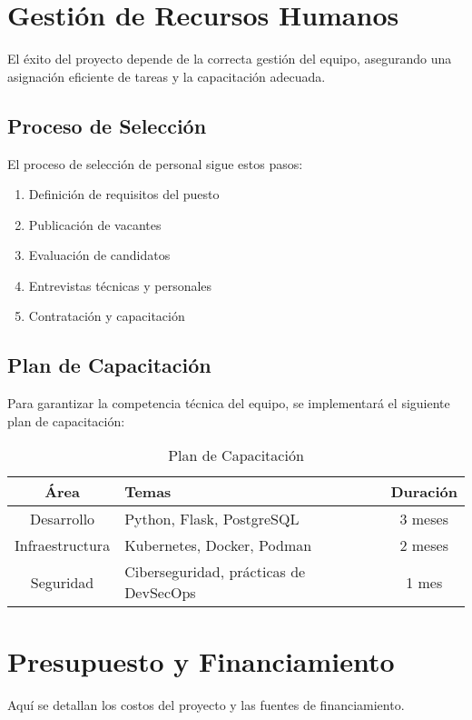 \section{Gestión de Recursos Humanos}

El éxito del proyecto depende de la correcta gestión del equipo, asegurando una asignación eficiente de tareas y la capacitación adecuada.

\subsection{Proceso de Selección}
El proceso de selección de personal sigue estos pasos:
\begin{enumerate}
	\item Definición de requisitos del puesto
	\item Publicación de vacantes
	\item Evaluación de candidatos
	\item Entrevistas técnicas y personales
	\item Contratación y capacitación
\end{enumerate}

\subsection{Plan de Capacitación}
Para garantizar la competencia técnica del equipo, se implementará el siguiente plan de capacitación:

\begin{table}[h]
	\centering
	\begin{tabular}{|c|l|c|}
		\hline
		\textbf{Área} & \textbf{Temas} & \textbf{Duración} \\ \hline
		Desarrollo & Python, Flask, PostgreSQL & 3 meses \\ \hline
		Infraestructura & Kubernetes, Docker, Podman & 2 meses \\ \hline
		Seguridad & Ciberseguridad, prácticas de DevSecOps & 1 mes \\ \hline
	\end{tabular}
	\caption{Plan de Capacitación}
\end{table}



\section{Presupuesto y Financiamiento}

Aquí se detallan los costos del proyecto y las fuentes de financiamiento.

